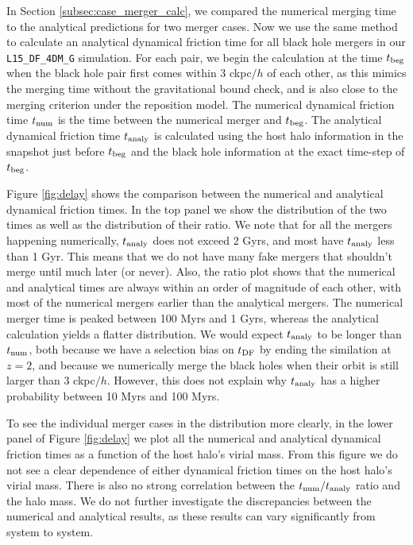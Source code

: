 In Section \ref{subsec:case_merger_calc}, we compared the numerical merging time to the analytical predictions for two merger cases. Now we use the same method to calculate an analytical dynamical friction time for all black hole mergers in our \texttt{L15\_DF\_4DM\_G} simulation. For each pair, we begin the calculation at the time $t_{\rm beg}$ when the black hole pair first comes within 3 ckpc$/h$ of each other, as this mimics the merging time without the gravitational bound check, and is also close to the merging criterion under the reposition model. The numerical dynamical friction time $t_{\rm num}$ is the time between the numerical merger and $t_{\rm beg}$. The analytical dynamical friction time $t_{\rm analy}$ is calculated using the host halo information in the snapshot just before $t_{\rm beg}$ and the black hole information at the exact time-step of $t_{\rm beg}$.

Figure \ref{fig:delay} shows the comparison between the numerical and analytical dynamical friction times. In the top panel we show the distribution of the two times as well as the distribution of their ratio. We note that for all the mergers happening numerically, $t_{\rm analy}$ does not exceed 2 Gyrs, and most have $t_{\rm analy}$ less than 1 Gyr. This means that we do not have many fake mergers that shouldn't merge until much later (or never). Also, the ratio plot shows that the numerical and analytical times are always within an order of magnitude of each other, with most of the numerical mergers earlier than the analytical mergers. The numerical merger time is peaked between 100 Myrs and 1 Gyrs, whereas the analytical calculation yields a flatter distribution. We would expect $t_{\rm analy}$ to be longer than $t_{\rm num}$, both because we have a selection bias on $t_{\rm DF}$ by ending the similation at $z=2$, and because we numerically merge the black holes when their orbit is still larger than 3 ckpc$/h$. However, this does not explain why $t_{\rm analy}$ has a higher probability between 10 Myrs and 100 Myrs. 

To see the individual merger cases in the distribution more clearly, in the lower panel of Figure \ref{fig:delay} we plot all the numerical and analytical dynamical friction times as a function of the host halo's virial mass. From this figure we do not see a clear dependence of either dynamical friction times on the host halo's virial mass. There is also no strong correlation between the $t_{\rm num}/t_{\rm analy}$ ratio and the halo mass. We do not further investigate the discrepancies between the numerical and analytical results, as these results can vary significantly from system to system. 

